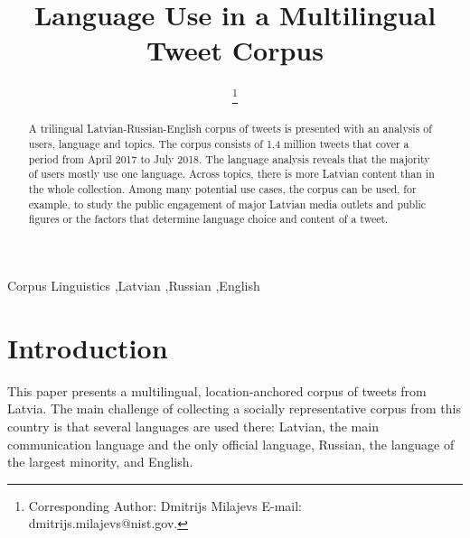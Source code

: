 \documentclass{IOS-Book-Article}
\begin{document}
\begin{frontmatter}              %

\title{Language Use in a Multilingual Tweet Corpus}

\author[A]{ %
  \thanks{Corresponding Author: Dmitrijs Milajevs
    E-mail: dmitrijs.milajevs@nist.gov.}}


\address[A]{Guest Researcher at National Institute of Standards and Technology, Maryland, USA}

\begin{abstract}
A trilingual Latvian-Russian-English corpus of tweets is presented with an analysis of users, language and topics. The corpus consists of 1.4 million tweets that cover a period from April 2017 to July 2018. The language analysis reveals that the majority of users mostly use one language. Across topics, there is more Latvian content than in the whole collection. Among many potential use cases, the corpus can be used, for example, to study the public engagement of major Latvian media outlets and public figures or the factors that determine language choice and content of a tweet.
\end{abstract}

\begin{keyword}
Corpus Linguistics \sep Latvian \sep Russian \sep English
\end{keyword}
\end{frontmatter}

\thispagestyle{empty}
\pagestyle{empty}

\section*{Introduction}

This paper presents a multilingual, location-anchored corpus of tweets from Latvia. The main challenge of collecting a socially representative corpus from this country is that several languages are used there: Latvian, the main communication language and the only official language, Russian, the language of the largest minority, and English.
\end{document}
